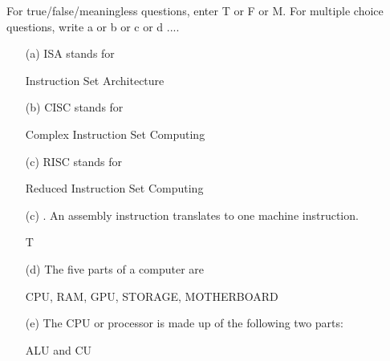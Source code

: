 \newpage
\nextq
For true/false/meaningless questions, enter T or F or M.
For multiple choice questions, write a or b or c or d ....
\begin{itemize}

\item[(a)]
  ISA stands for

  \ANSWER\vspace{4mm}
  \begin{answercode}
  Instruction Set Architecture
  \end{answercode}

\item[(b)]
  CISC stands for
 
  \ANSWER\vspace{4mm}
  \begin{answercode}
  Complex Instruction Set Computing
  \end{answercode}

\item[(c)]
  RISC stands for
  \\
  \ANSWER\vspace{4mm}
  \begin{answercode}
  Reduced Instruction Set Computing
  \end{answercode}
  
\item[(c)]
  \tf.
  An assembly instruction translates to one machine instruction.
  \\
  \ANSWER\vspace{4mm}
  \begin{answercode}
  T
  \end{answercode}
  
\item[(d)]
  The five parts of a computer are
  \\
  \ANSWER\vspace{4mm}
  \begin{answercode}
  CPU, RAM, GPU, STORAGE, MOTHERBOARD
  \end{answercode}
  
\item[(e)]
  The CPU or processor is made up of the following two parts:
  \\
  \ANSWER\vspace{4mm}
  \begin{answercode}
  ALU and CU
  \end{answercode}
  

\end{itemize}
